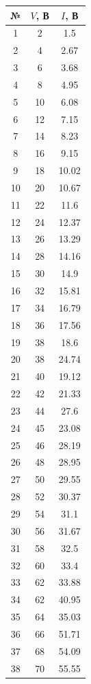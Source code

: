 \documentclass[a4paper, 12pt]{article}
\begin{document}
	\begin{table}[!htb]
			\begin{tabular}{|c|c|c|}
			\hline
			№ & $V$, В & $I$, В\\
			\hline
 			1 & 2 & 1.5 \\
 			 2 & 4 & 2.67 \\
 			 3 & 6 & 3.68 \\
 			 4 & 8 & 4.95 \\
 			 5 & 10 & 6.08 \\
 			 6 & 12 & 7.15 \\
 			 7 & 14 & 8.23 \\
 			 8 & 16 & 9.15 \\
 			 9 & 18 & 10.02 \\
 			 10 & 20 & 10.67 \\
 			 11 & 22 & 11.6 \\
 			 12 & 24 & 12.37 \\
 			 13 & 26 & 13.29 \\
 			 14 & 28 & 14.16 \\
 			 15 & 30 & 14.9 \\
 			 16 & 32 & 15.81 \\
 			 17 & 34 & 16.79 \\
 			 18 & 36 & 17.56 \\
 			 19 & 38 & 18.6 \\
 			 20 & 38 & 24.74 \\
 			 21 & 40 & 19.12 \\
 			 22 & 42 & 21.33 \\
 			 23 & 44 & 27.6 \\
 			 24 & 45 & 23.08 \\
 			 25 & 46 & 28.19 \\
 			 26 & 48 & 28.95 \\
 			 27 & 50 & 29.55 \\
 			 28 & 52 & 30.37 \\
 			 29 & 54 & 31.1 \\
 			 30 & 56 & 31.67 \\
 			 31 & 58 & 32.5 \\
 			 32 & 60 & 33.4 \\
 			 33 & 62 & 33.88 \\
 			 34 & 62 & 40.95 \\
 			 35 & 64 & 35.03 \\
 			 36 & 66 & 51.71 \\
 			 37 & 68 & 54.09 \\
 			 38 & 70 & 55.55 \\

\end{tabular}
\end{table}
\end{document}
